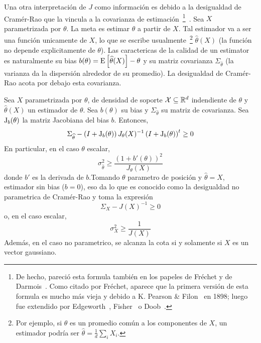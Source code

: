 Una otra interpretaci\'on  de $J$ como informaci\'on es  debido a la desigualdad
de  Cram\'er-Rao que  la vincula  a la  covarianza  de estimaci\'on~\footnote{De
  hecho,  pareci\'o esta  formula tambi\'en  en los  papeles de  Fr\'echet  y de
  Darmois~\cite{Fre43, Dar45}. Como citado por Fr\'echet, aparece que la primera
  versi\'on  de esta  formula  es mucho  m\'as vieja  y  debido a  K.  Pearson  \&
  Filon~\cite{PeaFil98} en 1898; luego fue extendido por Edgeworth~\cite{Edg08},
  Fisher~\cite{Fis25:07}  o  Doob~\cite{Doo36}.}~\cite{Rao45,  Rao92,  RaoWis47,
  Cra46,  Rio07, CovTho06,  Fri04,  Kay93, Bos07}.   Sea  $X$ parametrizada  por
$\theta$.  La meta es estimar $\theta$ a  partir de $X$.  Tal estimador va a ser
una  funci\'on unicamente  de $X$,  lo que  se  escribe usualmente~\footnote{Por
  ejemplo,  si $\theta$  es un  promedio com\'un  a los  componentes de  $X$, un
  estimador   podr\'ia   ser   $\widehat{\theta}   =   \frac1d   \sum_i   X_i$.}
$\widehat{\theta}(X)$ (la funci\'on no depende explicitamente de $\theta$).  Las
caractericas de la calidad de un  estimator es naturalmente su bias $b(\theta) =
\operatorname{E}\left[  \widehat{\theta}(X)  \right]  -   \theta$  y  su  matriz  covarianza
$\Sigma_{\widehat{\theta}}$  (la varianza  da  la dispersi\'on  alrededor de  su
promedio). La desigualdad de Cram\'er-Rao acota por debajo esta covarianza.
%
\begin{teorema}
  Sea  $X$ parametrizada  por $\theta$,  de  densidad de  soporte $\mathcal{X}  \subseteq
  \mathbb{R}^d$  indendiente  de $\theta$  y  $\widehat{\theta}(X)$  un estimador  de
  $\theta$.  Sea $b(\theta)$ su  bias y $\Sigma_{\widehat{\theta}}$ su matriz de
  covarianza.   Sea   $\operatorname{J}_b(\theta)$  la   matriz  Jacobiana  del   bias  $b$.
  Entonces,
  \[
  \Sigma_{\widehat{\theta}} - \left( I + \operatorname{J}_b(\theta) \right) J_\theta(X)^{-1}
  \left( I + \operatorname{J}_b(\theta) \right)^t \ge 0
  \]
  En particular, en el  caso $\theta$ escalar,
  \[
  \sigma_{\widehat{\theta}}^2 \ge \frac{(1+b'(\theta))^2}{J_\theta(X)}
  \]
  donde  $b'$ es  la  derivada  de $b$.\newline  Tomando  $\theta$ parametro  de
  posici\'on y $\widehat{\theta}  = X$, estimador sin bias ($b =  0$), eso da lo
  que es conocido  como la desigualdad no parametrica de  Cram\'er-Rao y toma la
  expresi\'on
  \[
  \Sigma_X - J(X)^{-1} \ge 0
  \]
  o, en el caso escalar,
  \[
  \sigma_X^2 \ge \frac{1}{J(X)}
  \]
  Adem\'as, en el caso no parametrico, se alcanza la cota si y solamente si $X$ es
  un vector gaussiano.
\end{teorema}
